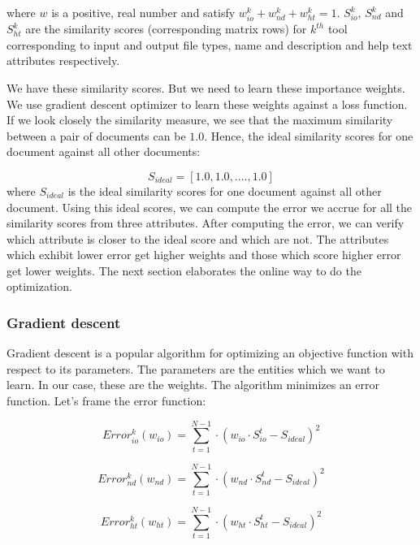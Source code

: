 where $w$ is a positive, real number and satisfy $w^k_{io} + w^k_{nd} + w^k_{ht} = 1$. 
$S^k_{io}$, $S^k_{nd}$ and $S^k_{ht}$ are the similarity scores (corresponding matrix rows) for $k^{th}$ tool corresponding to input and output file types, name and description and help text attributes respectively.

We have these similarity scores. But we need to learn these importance weights. We use gradient descent optimizer to learn these weights against a loss function. If we look closely the similarity measure, we see that the maximum similarity between a pair of documents can be $1.0$. Hence, the ideal similarity scores for one document against all other documents:

\begin{equation}
S_{ideal} = [ 1.0, 1.0, ...., 1.0 ]
\end{equation}
where $S_{ideal}$ is the ideal similarity scores for one document against all other document. Using this ideal scores, we can compute the error we accrue for all the similarity scores from three attributes. After computing the error, we can verify which attribute is closer to the ideal score and which are not. The attributes which exhibit lower error get higher weights and those which score higher error get lower weights. The next section elaborates the online way to do the optimization.


\subsubsection{Gradient descent}
Gradient descent is a popular algorithm for optimizing an objective function with respect to its parameters. The parameters are the entities which we want to learn. In our case, these are the weights. The algorithm minimizes an error function. Let's frame the error function:

\begin{equation}
Error^k_{io}(w_{io}) = \sum_{t=1}^{N-1} \cdot (w_{io} \cdot S^t_{io} - S_{ideal}) ^ 2
\end{equation}

\begin{equation}
Error^k_{nd}(w_{nd}) = \sum_{t=1}^{N-1} \cdot (w_{nd} \cdot S^t_{nd} - S_{ideal}) ^ 2
\end{equation}

\begin{equation}
Error^k_{ht}(w_{ht}) = \sum_{t=1}^{N-1} \cdot (w_{ht} \cdot S^t_{ht} - S_{ideal}) ^ 2
\end{equation}

